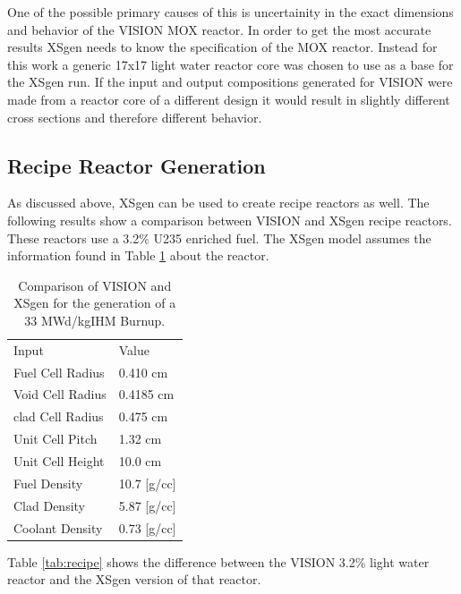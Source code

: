 \documentclass{article}
\begin{document}
One of the possible primary causes of this is uncertainity in the exact dimensions and behavior of the VISION MOX reactor. In order to get the most accurate results XSgen needs to know the specification of the MOX reactor. Instead for this work a generic 17x17 light water reactor core was chosen to use as a base for the XSgen run. If the input and output compositions generated for VISION were made from a reactor core of a different design it would result in slightly different cross sections and therefore different behavior.

\subsection{Recipe Reactor Generation}
As discussed above, XSgen can be used to create recipe reactors as well. The following results show a comparison between VISION and XSgen recipe reactors. These reactors use a 3.2\% U235 enriched fuel. The XSgen model assumes the information found in Table \ref{tab:xsgenstats} about the reactor. 
 
\begin{table}[!htb]
\centering
\caption{Comparison of VISION and XSgen for the generation of a 33 MWd/kgIHM Burnup.}
\label{tab:xsgenstats}
\begin{tabular}{ll}
Input & Value \\
Fuel Cell Radius & 0.410 cm \\
Void Cell Radius & 0.4185 cm \\ 
clad Cell Radius & 0.475 cm \\
Unit Cell Pitch  & 1.32 cm \\
Unit Cell Height & 10.0 cm \\
Fuel Density & 10.7 [g/cc] \\
Clad Density & 5.87 [g/cc] \\
Coolant Density & 0.73 [g/cc] 
\end{tabular}
\end{table}

Table \ref{tab:recipe} shows the difference between the VISION 3.2\% light water reactor and the XSgen version of that reactor. 
\end{document}
